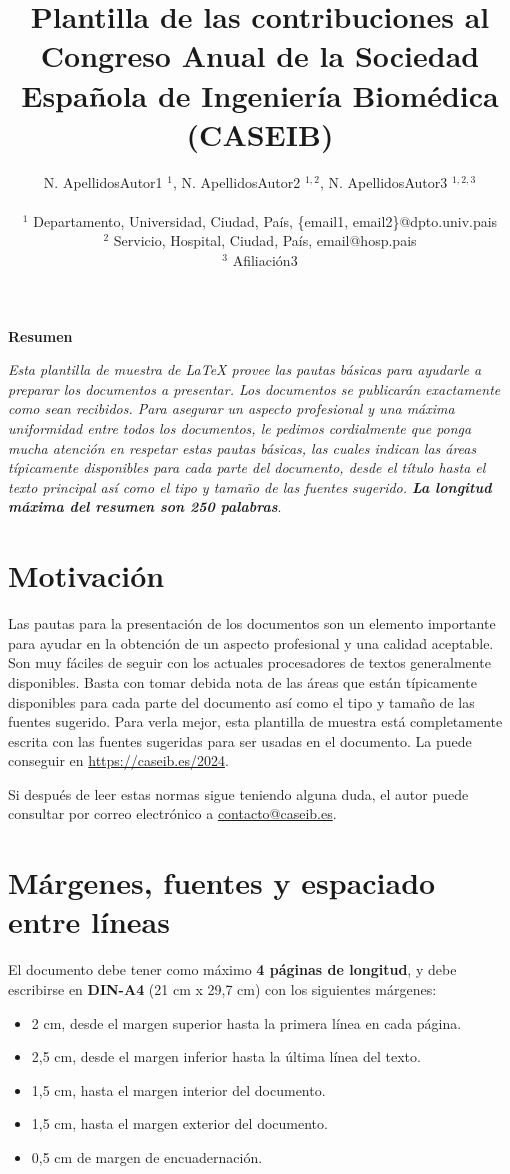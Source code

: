 \documentclass[a4paper,10pt,twocolumn]{article}
\title{\LARGE \textbf{Plantilla de las contribuciones al Congreso Anual de la Sociedad Española de Ingeniería Biomédica (CASEIB)}}
\author{\large N. ApellidosAutor1 $^1$, N. ApellidosAutor2 $^{1,2}$, N. ApellidosAutor3 $^{1,2,3}$
\\
\\
\small $^1$ Departamento, Universidad, Ciudad, País, \{email1, email2\}@dpto.univ.pais \\
\small $^2$ Servicio, Hospital, Ciudad, País, email@hosp.pais \\
\small $^3$ Afiliación3 \\
}
\date{} %
\newcommand{\link}[1]{{\color{blue}\href{#1}{#1}}}
\begin{document}
	

\maketitle
\thispagestyle{empty}

\begin{center}
\large
\textbf{Resumen}
\end{center}
\small
\textit{Esta plantilla de muestra de \LaTeX\/ provee las pautas básicas para ayudarle a preparar los documentos a presentar. Los documentos se publicarán exactamente como sean recibidos. Para asegurar un aspecto profesional y una máxima uniformidad entre todos los documentos, le pedimos cordialmente que ponga mucha atención en respetar estas pautas básicas, las cuales indican las áreas típicamente disponibles para cada parte del documento, desde el título hasta el texto principal así como el tipo y tamaño de las fuentes sugerido. \textbf{La longitud máxima del resumen son 250 palabras}}. 

\normalsize

\section{Motivación}
Las pautas para la presentación de los documentos son un elemento importante para ayudar en la obtención de un aspecto profesional y una calidad aceptable. Son muy fáciles de seguir con los actuales procesadores de textos generalmente disponibles. Basta con tomar debida nota de las áreas que están típicamente disponibles para cada parte del documento así como el tipo y tamaño de las fuentes sugerido. Para verla mejor, esta plantilla de muestra está completamente escrita con las fuentes sugeridas para ser usadas en el documento. La puede conseguir en \link{https://caseib.es/2024}.

Si después de leer estas normas sigue teniendo alguna duda, el autor puede consultar por correo electrónico a \href{mailto:contacto@caseib.es}{contacto@caseib.es}.
 
\section{Márgenes, fuentes y espaciado entre líneas}
El documento debe tener como máximo \textbf{4 páginas de longitud}, y debe escribirse en \textbf{DIN-A4} (21 cm x 29,7 cm) con los siguientes márgenes:
\begin{itemize}[topsep=0pt, partopsep=0pt, parsep=0pt]
\item 2 cm, desde el margen superior hasta la primera línea en cada página.
\item 2,5 cm, desde el margen inferior hasta la última línea del texto.
\item 1,5 cm, hasta el margen interior del documento.
\item 1,5 cm, hasta el margen exterior del documento.
\item 0,5 cm de margen de encuadernación.
\end{itemize}
\end{document}
